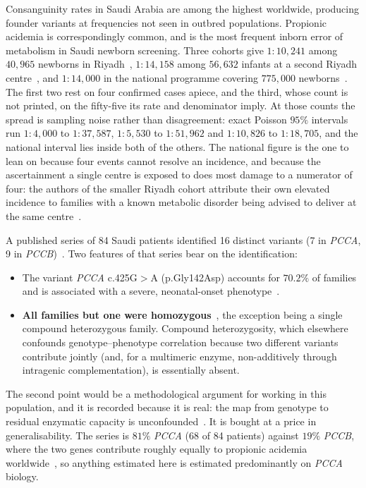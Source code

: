 \begin{itemize}[leftmargin=*]
Consanguinity rates in Saudi Arabia are among the highest worldwide, producing founder
variants at frequencies not seen in outbred populations. Propionic acidemia is
correspondingly common, and is the most frequent inborn error of metabolism in Saudi
newborn screening. Three cohorts give $1{:}10{,}241$ among $40{,}965$ newborns in
Riyadh~\cite{nbs_riyadh_kfmc}, $1{:}14{,}158$ among $56{,}632$ infants at a second Riyadh
centre~\cite{nbs_psmmc}, and $1{:}14{,}000$ in the national programme covering
$775{,}000$ newborns~\cite{nbs_saudi_national}. %
The first two rest on four confirmed cases apiece, and the third, whose count is not
printed, on the fifty-five its rate and denominator imply. At those counts the spread is
sampling noise rather than disagreement: exact Poisson $95\%$ intervals run $1{:}4{,}000$ to
$1{:}37{,}587$, $1{:}5{,}530$ to $1{:}51{,}962$ and $1{:}10{,}826$ to $1{:}18{,}705$, and
the national interval lies inside both of the others.
The national figure is the one to lean on because four events cannot resolve an incidence,
and because the ascertainment a single centre is exposed to does most damage to a numerator
of four: the authors of the smaller Riyadh cohort attribute their own elevated incidence to
families with a known metabolic disorder being advised to deliver at the same
centre~\cite{nbs_riyadh_kfmc}. %

A published series of 84 Saudi patients identified 16 distinct variants (7 in \emph{PCCA},
9 in \emph{PCCB})~\cite{saudi84}. %
Two features of that series bear on the identification:

\begin{itemize}[leftmargin=*, itemsep=2pt]
\item The variant \emph{PCCA} c.425G$>$A (p.Gly142Asp) accounts for $70.2\%$ of families and
      is associated with a severe, neonatal-onset phenotype~\cite{saudi84}. %
\item \textbf{All families but one were homozygous}~\cite{saudi84}, the exception being a
      single compound heterozygous family. %
      Compound heterozygosity, which
      elsewhere confounds genotype--phenotype correlation because two different variants
      contribute jointly (and, for a multimeric enzyme, non-additively through intragenic
      complementation), is essentially absent.
\end{itemize}

The second point would be a methodological argument for working in this population, and it
is recorded because it is real: the map from genotype to residual enzymatic capacity is
unconfounded~\cite{saudi84}. %
It is bought at a price in generalisability. The series is $81\%$ \emph{PCCA}
(68 of 84 patients) against $19\%$ \emph{PCCB}, where the two genes contribute roughly
equally to propionic acidemia worldwide~\cite{saudi84,genereviews_pa}, %
so anything estimated here is estimated predominantly on \emph{PCCA} biology.


\end{itemize}
